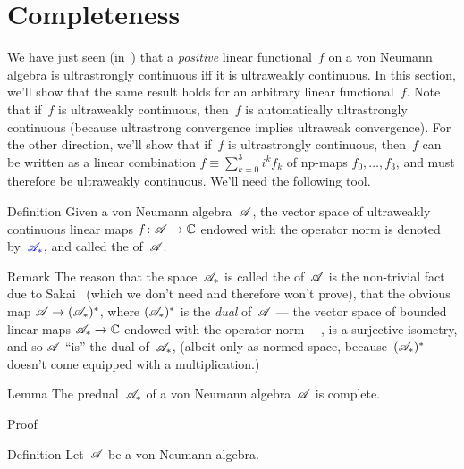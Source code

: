\documentclass[a]{subfiles}
\begin{document}
\section{Completeness}
\begin{parsec}%
\begin{point}%
	We have just seen (in~)
	that a \emph{positive} linear functional~$f$
on a von Neumann algebra 
is ultrastrongly continuous iff it is ultraweakly continuous.
In this section, we'll show that the same result holds
for an arbitrary linear functional~$f$.
Note that if~$f$ is ultraweakly continuous,
then~$f$ is automatically ultrastrongly continuous
(because ultrastrong convergence implies ultraweak convergence).
For the other direction,
we'll show that if~$f$ is ultrastrongly continuous,
then~$f$ can be written as a linear combination
$f\equiv \sum_{k=0}^3 i^k f_k$
of np-maps $f_0,\dotsc,f_3$,
and must therefore be ultraweakly continuous.
We'll need the following tool.
\end{point}
\begin{point}{Definition}%
Given a von Neumann algebra~$\mathscr{A}$,
the vector space of ultraweakly continuous 
linear maps $f\colon \mathscr{A}\to \mathbb{C}$
endowed with the operator norm
is denoted by~$\Define{\scrA_*}$,
and called the  of~$\mathscr{A}$.
\begin{point}{Remark}%
The reason
that the space~$\mathscr{A}_*$ is called the 
of~$\mathscr{A}$
is the non-trivial fact due to Sakai~\cite{sakai} (which we 
don't need and therefore won't prove),
that the obvious 
map $\mathscr{A}\to(\mathscr{A}_*)^*$,
where $(\mathscr{A}_*)^*$ is the \emph{dual} of~$\mathscr{A}$ --- the
vector space of bounded linear maps $\mathscr{A}_*\to\mathbb{C}$
endowed with the operator norm ---,
is a surjective isometry,
and so $\mathscr{A}$ ``is'' the dual of~$\mathscr{A}_*$,
(albeit only as normed space,
because~$(\mathscr{A}_*)^*$ doesn't come equipped with a multiplication.)
\end{point}
\end{point}
\begin{point}{Lemma}%
The predual~$\mathscr{A}_*$ of a von Neumann algebra~$\mathscr{A}$
is complete.
\begin{point}{Proof}%
\end{point}
\end{point}
\begin{point}[bstaromega]{Definition}%
Let~$\mathscr{A}$ be a von Neumann algebra.

\end{point}
\end{parsec}
\end{document}
